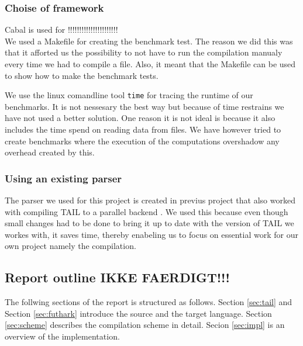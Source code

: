 \documentclass[11pt]{article}
\begin{document}
\subsubsection{Choise of framework}
Cabal is used for !!!!!!!!!!!!!!!!!!!!!!\\

We used a Makefile for creating the benchmark test. The reason we did this was that it afforted us the possibility to not have to run the compilation manualy every time we had to compile a file. Also, it meant that the Makefile can be used to show how to make the benchmark tests. 

We use the linux comandline tool {\tt time} for tracing the runtime of our benchmarks. 
It is not nessesary the best way but because of time restrains we have not used a better solution. 
One reason it is not ideal is because it also includes the time spend on reading data from files. We have however tried to create benchmarks where the execution of the computations overshadow any overhead created by this. 

\subsubsection{Using an existing parser}
The parser we used for this project is created in previus project that also worked with compiling TAIL to a parallel backend \cite{APLACC}. We used this because even though small changes had to be done to bring it up to date with the version of TAIL we workes with, it saves time, thereby enabeling us to focus on essential work for our own project namely the compilation.

\subsection{Report outline IKKE FAERDIGT!!!}
The follwing sections of the report is structured as follows. Section \ref{sec:tail} and Section \ref{sec:futhark} introduce the source and the target language. Section \ref{sec:scheme} describes the compilation scheme in detail. Secion \ref{sec:impl} is an overview of the implementation.


\end{document}
